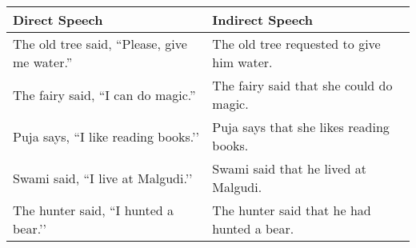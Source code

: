 \documentclass[a4paper,12pt]{book}
\begin{document}
\begin{ORG}


\begin{center}
\begin{tabular}{ll}
Direct Speech & Indirect Speech\\[0pt]
\hline
The old tree said, “Please, give me water.” & The old tree requested to give him water.\\[0pt]
The fairy said, “I can do magic.” & The fairy said that she could do magic.\\[0pt]
Puja says, “I like reading books.’’ & Puja says that she likes reading books.\\[0pt]
Swami said, “I live at Malgudi.’’ & Swami said that he lived at Malgudi.\\[0pt]
The hunter said, “I hunted a bear.’’ & The hunter said that he had hunted a bear.\\[0pt]
\end{tabular}
\end{center}
\end{ORG}
\end{document}
